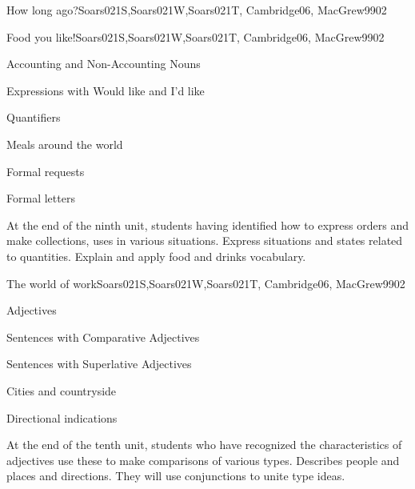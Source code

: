 \begin{syllabus}
\begin{unit}{How long ago?}{}{Soars021S,Soars021W,Soars021T, Cambridge06, MacGrew99}{0}{2}
\end{unit}

\begin{unit}{Food you like!}{}{Soars021S,Soars021W,Soars021T, Cambridge06, MacGrew99}{0}{2}
   \begin{topics}
      \item Accounting and Non-Accounting Nouns
      \item Expressions with Would like and I'd like
      \item Quantifiers
      \item Meals around the world
      \item Formal requests
      \item Formal letters
   \end{topics}

   \begin{learningoutcomes}
      \item At the end of the ninth unit, students having identified how to express orders and make collections, uses in various situations. Express situations and states related to quantities. Explain and apply food and drinks vocabulary.
   \end{learningoutcomes}
\end{unit}

\begin{unit}{The world of work}{}{Soars021S,Soars021W,Soars021T, Cambridge06, MacGrew99}{0}{2}
   \begin{topics}
      \item Adjectives
      \item Sentences with Comparative Adjectives
      \item Sentences with Superlative Adjectives
      \item Cities and countryside
      \item Directional indications
   \end{topics}

   \begin{learningoutcomes}
      \item At the end of the tenth unit, students who have recognized the characteristics of adjectives use these to make comparisons of various types. Describes people and places and directions. They will use conjunctions to unite type ideas.
   \end{learningoutcomes}

\end{unit}


\end{syllabus}
